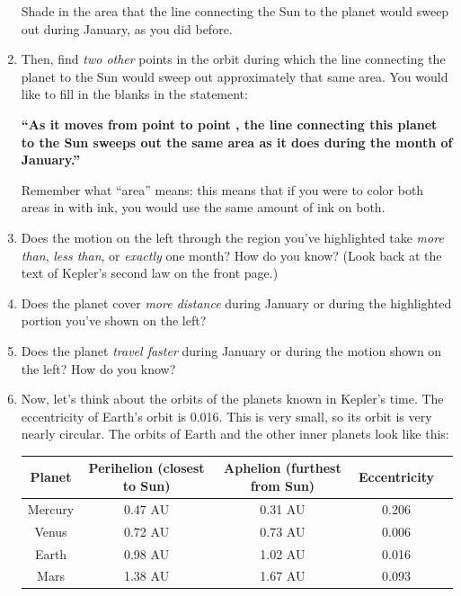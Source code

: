 \documentclass[12pt]{article}
\begin{document}
\begin{enumerate}
\begin{center}
\end{center}


Shade in the area that the line connecting the Sun to the planet would sweep out during January, as you did before.

\bigskip

\item Then, find {\it two other} points in the orbit during which the line connecting the planet to the Sun would sweep out approximately that same area. You would like to fill in the blanks in the statement:


\bf ``As it moves from point \underline{\hspace{0.5in}} to point \underline{\hspace{0.5in}}, the line connecting this planet to the Sun sweeps out the same area as it does during the month of January.''

\rm


Remember what ``area'' means: this means that if you were to color both areas in with ink, you would use the same amount of ink on both.

\bigskip

\item Does the motion on the left through the region you've highlighted take {\it more than}, {\it less than}, or {\it exactly} one month? How do you know? (Look back at the text of Kepler's second law on the front page.)

\vspace{1.5in}

\item Does the planet cover {\it more distance} during January or during the highlighted portion you've shown on the left?

\vspace{1in}

\item {Does the planet {\it travel faster} during January or during the motion shown on the left? How do you know?}

\vspace{1in}



\item Now, let's think about the orbits of the planets known in Kepler's time. The eccentricity of Earth's orbit is 0.016. This is very small, so its orbit is very nearly circular. The orbits of Earth and the other inner planets look like this:

\begin{tabular}{|c|c|c|c|c|}
\hline
Planet & Perihelion (closest to Sun) & Aphelion (furthest from Sun) & Eccentricity \\ \hline
Mercury & 0.47 AU & 0.31 AU & 0.206 \\ \hline
Venus & 0.72 AU & 0.73 AU & 0.006\\ \hline
Earth &  0.98 AU & 1.02 AU & 0.016\\ \hline
Mars & 1.38 AU & 1.67 AU & 0.093 \\ \hline
\end{tabular}


\end{enumerate}
\end{document}
